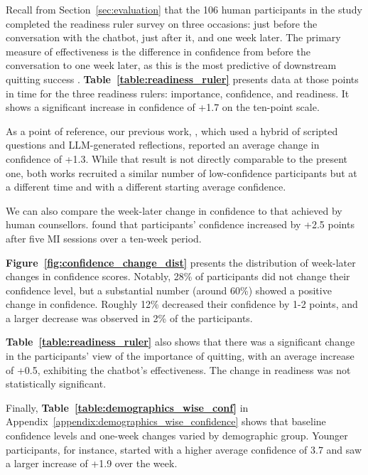 Recall from Section~\ref{sec:evaluation} that the 106 human participants in the study completed the readiness ruler survey on three occasions: just before the conversation with the chatbot, just after it, and one week later. The primary measure of effectiveness is the difference in confidence from before the conversation to one week later, as this is the most predictive of downstream quitting success \citep{Gwaltney2009-wj}.
\textbf{Table~\ref{table:readiness_ruler}} presents data at those points in time for the three readiness rulers: importance, confidence, and readiness. It shows a significant increase in confidence of +1.7 on the ten-point scale.

As a point of reference, our previous work, \oldsysname \citep{info:doi/10.2196/49132}, which used a hybrid of scripted questions and LLM-generated reflections, reported an average change in confidence of +1.3. While that result is not directly comparable to the present one, both works recruited a similar number of low-confidence participants but at a different time and with a different starting average confidence.

We can also compare the week-later change in confidence to that achieved by human counsellors. \citet{rachelthesis} found that participants' confidence increased by +2.5 points after five MI sessions over a ten-week period.

\textbf{Figure~\ref{fig:confidence_change_dist}} presents the distribution of week-later changes in confidence scores. Notably, 28\% of  participants did not change their confidence level, but a substantial number (around 60\%) showed a positive change in confidence. Roughly 12\% decreased their confidence by 1-2 points, and a larger decrease was observed in 2\% of the participants.

\textbf{Table~\ref{table:readiness_ruler}} also shows that there was a significant change in the participants' view of the importance of quitting, with an average increase of +0.5, exhibiting the chatbot's effectiveness. The change in readiness was not statistically significant.

Finally, \textbf{Table~\ref{table:demographics_wise_conf}} in Appendix~\ref{appendix:demographics_wise_confidence} shows that baseline confidence levels and one-week changes varied by demographic group. Younger participants, for instance, started with a higher average confidence of 3.7 and saw a larger increase of +1.9 over the week.


